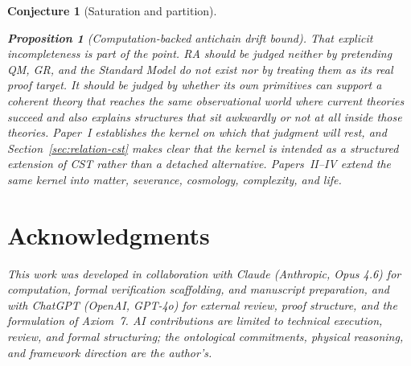 \documentclass[11pt]{article}
\newtheorem{proposition}{Proposition}
\newtheorem{conjecture}{Conjecture}
\begin{document}
\begin{conjecture}[Saturation and partition]
\begin{proposition}[Computation-backed antichain drift bound]
That explicit incompleteness is part of the point. RA should be judged neither by pretending QM, GR, and the Standard Model do not exist nor by treating them as its real proof target. It should be judged by whether its own primitives can support a coherent theory that reaches the same observational world where current theories succeed and also explains structures that sit awkwardly or not at all inside those theories. Paper~I establishes the kernel on which that judgment will rest, and Section~\ref{sec:relation-cst} makes clear that the kernel is intended as a structured extension of CST rather than a detached alternative. Papers~II--IV extend the same kernel into matter, severance, cosmology, complexity, and life.

\section*{Acknowledgments}

This work was developed in collaboration with Claude (Anthropic, Opus 4.6) for computation, formal verification scaffolding, and manuscript preparation, and with ChatGPT (OpenAI, GPT-4o) for external review, proof structure, and the formulation of Axiom~7. AI contributions are limited to technical execution, review, and formal structuring; the ontological commitments, physical reasoning, and framework direction are the author's.


\end{proposition}
\end{conjecture}
\end{document}
